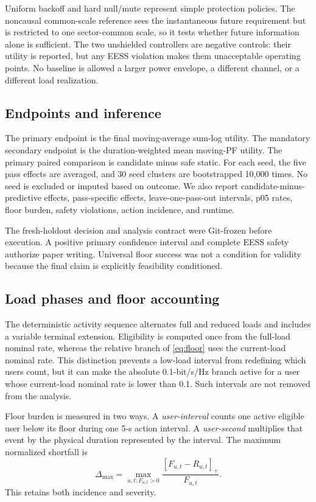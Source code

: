 \documentclass[journal]{IEEEtran}
\begin{document}
Uniform backoff and hard null/mute represent simple protection policies. The noncausal common-scale reference sees the instantaneous future requirement but is restricted to one sector-common scale, so it tests whether future information alone is sufficient. The two unshielded controllers are negative controls: their utility is reported, but any EESS violation makes them unacceptable operating points. No baseline is allowed a larger power envelope, a different channel, or a different load realization.

\subsection{Endpoints and inference}
The primary endpoint is the final moving-average sum-log utility. The mandatory secondary endpoint is the duration-weighted mean moving-PF utility. The primary paired comparison is candidate minus safe static. For each seed, the five pass effects are averaged, and 30 seed clusters are bootstrapped 10,000 times. No seed is excluded or imputed based on outcome. We also report candidate-minus-predictive effects, pass-specific effects, leave-one-pass-out intervals, p05 rates, floor burden, safety violations, action incidence, and runtime.

The fresh-holdout decision and analysis contract were Git-frozen before execution. A positive primary confidence interval and complete EESS safety authorize paper writing. Universal floor success was not a condition for validity because the final claim is explicitly feasibility conditioned.


\subsection{Load phases and floor accounting}
The deterministic activity sequence alternates full and reduced loads and includes a variable terminal extension. Eligibility is computed once from the full-load nominal rate, whereas the relative branch of \eqref{eq:floor} uses the current-load nominal rate. This distinction prevents a low-load interval from redefining which users count, but it can make the absolute 0.1-bit/s/Hz branch active for a user whose current-load nominal rate is lower than 0.1. Such intervals are not removed from the analysis.

Floor burden is measured in two ways. A \emph{user-interval} counts one active eligible user below its floor during one 5-s action interval. A \emph{user-second} multiplies that event by the physical duration represented by the interval. The maximum normalized shortfall is
\begin{equation}
 \Delta_{\max}=\max_{u,t:F_{u,t}>0}
 \frac{[F_{u,t}-R_{u,t}]_+}{F_{u,t}}.
 \label{eq:shortfall}
\end{equation}
This retains both incidence and severity.
\end{document}
